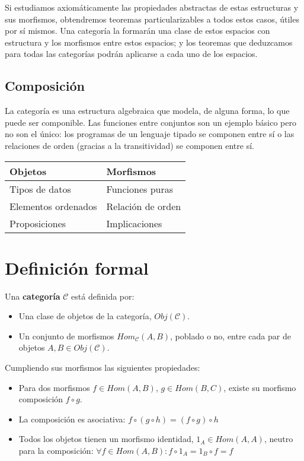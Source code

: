 \documentclass[11pt, fleqn, spanish]{book}
\newcommand{\C}{\mathcal{C}}
\begin{document}
Si estudiamos axiomáticamente las propiedades abstractas de estas estructuras y sus morfismos,
obtendremos teoremas particularizables a todos estos casos, útiles por sí mismos.
Una categoría la formarán una clase de estos espacios con estructura y los morfismos entre estos
espacios; y los teoremas que deduzcamos para todas las categorías podrán aplicarse a cada uno de
los espacios.

\subsection{Composición}
La categoría es una estructura algebraica que modela, de alguna forma,
lo que puede ser componible. Las funciones entre conjuntos son un ejemplo
básico pero no son el único: los programas de un lenguaje tipado se componen
entre sí o las relaciones de orden (gracias a la transitividad) se componen
entre sí.

\begin{center}
  \begin{tabular}{l|l}
    Objetos & Morfismos \\
    \hline
    Tipos de datos & Funciones puras \\
    Elementos ordenados & Relación de orden \\
    Proposiciones & Implicaciones
  \end{tabular}
\end{center}


\section {Definición formal}
\begin{definition}
  Una \textbf{categoría} $\C$ está definida por:
  
  \begin{itemize}
  \item Una clase de objetos de la categoría, $Obj(\mathcal{C})$.
  \item Un conjunto de morfismos $Hom_{\C}(A,B)$, poblado o no, entre
    cada par de objetos $A,B \in Obj(\C)$.
  \end{itemize}
  
\end{definition}

Cumpliendo sus morfismos las siguientes propiedades:

\begin{itemize}
\item Para dos morfismos $f \in Hom(A,B)$, $g \in Hom(B,C)$, existe su
  morfismo composición $f \circ g$.
\item La composición es asociativa: $f \circ (g \circ h) = (f \circ g) \circ h$
\item Todos los objetos tienen un morfismo identidad,
  $1_{A} \in Hom(A,A)$, neutro para la composición:
  $\forall f \in Hom(A,B): f \circ 1_{A} = 1_{B} \circ f = f$
\end{itemize}
\end{document}
